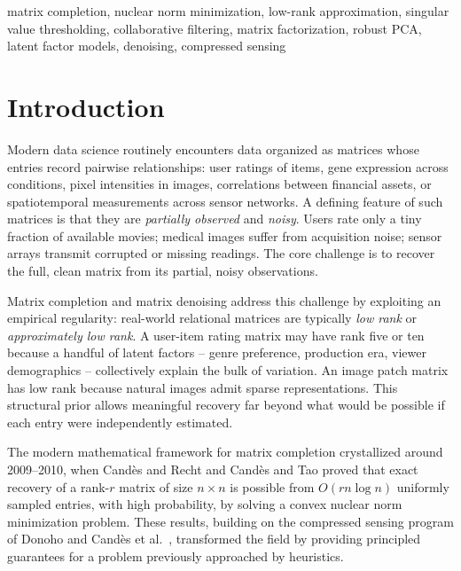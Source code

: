 \documentclass[conference]{IEEEtran}
\begin{document}
\begin{IEEEkeywords}
matrix completion, nuclear norm minimization, low-rank approximation, singular value thresholding, collaborative filtering, matrix factorization, robust PCA, latent factor models, denoising, compressed sensing
\end{IEEEkeywords}

\section{Introduction}

Modern data science routinely encounters data organized as matrices whose entries record pairwise relationships: user ratings of items, gene expression across conditions, pixel intensities in images, correlations between financial assets, or spatiotemporal measurements across sensor networks. A defining feature of such matrices is that they are \emph{partially observed} and \emph{noisy}. Users rate only a tiny fraction of available movies; medical images suffer from acquisition noise; sensor arrays transmit corrupted or missing readings. The core challenge is to recover the full, clean matrix from its partial, noisy observations.

Matrix completion and matrix denoising address this challenge by exploiting an empirical regularity: real-world relational matrices are typically \emph{low rank} or \emph{approximately low rank}. A user-item rating matrix may have rank five or ten because a handful of latent factors -- genre preference, production era, viewer demographics -- collectively explain the bulk of variation. An image patch matrix has low rank because natural images admit sparse representations. This structural prior allows meaningful recovery far beyond what would be possible if each entry were independently estimated.

The modern mathematical framework for matrix completion crystallized around 2009--2010, when Cand\`{e}s and Recht \cite{candes2009exact} and Cand\`{e}s and Tao \cite{candes2010power} proved that exact recovery of a rank-$r$ matrix of size $n \times n$ is possible from $O(rn \log n)$ uniformly sampled entries, with high probability, by solving a convex nuclear norm minimization problem. These results, building on the compressed sensing program of Donoho \cite{donoho2006compressed} and Cand\`{e}s et al.\ \cite{candes2006robust}, transformed the field by providing principled guarantees for a problem previously approached by heuristics.
\end{document}
